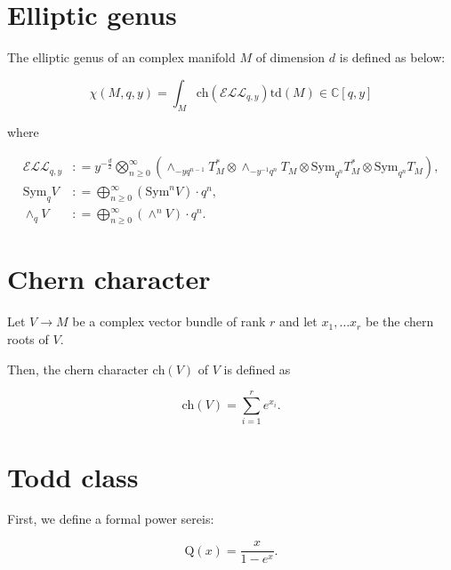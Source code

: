 \documentclass[uplatex,dvipdfmx]{jsarticle}
\newcommand{\defeq}{\mathrel{\mathop:}=}
\newcommand{\Sym}{\mathrm{Sym}}
\newcommand{\ch}[1]{\mathrm{ch}\left( {#1} \right)}
\newcommand{\td}[1]{\mathrm{td}\left( {#1} \right)}
\begin{document}
\section{Elliptic genus}

The elliptic genus of an complex manifold 
$M$
of dimension 
$d$
is defined as below:

\begin{equation}
    \chi(M, q, y)
    =
    \int_M
    \ch{\mathcal{ELL}_{q,y}}
    \td{M}
    \in
    \mathbb{C}[ q, y ]
\end{equation}

where

\begin{align}
    \mathcal{ELL}_{q, y}
    &\defeq
    y^{- \frac{d}{2}}
    \bigotimes_{n \geq 0}^{\infty}
    \left( 
        \wedge_{-yq^{n-1}} T_M^*
        \otimes
        \wedge_{-y^{-1}q^n} T_M
        \otimes
        \Sym_{q^n} T_M^*
        \otimes
        \Sym_{q^n}T_M
    \right), \\
    \Sym_q V
    &\defeq
    \bigoplus_{n \geq 0} ^{\infty}
    \left( 
        \Sym^n V
    \right)
    \cdot
    q^n, \\
    \wedge_q V
    &\defeq
    \bigoplus_{n \geq 0}^{\infty}
    \left( 
        \wedge^n V
    \right)
    \cdot
    q^n.
\end{align}

\section{Chern character}

Let 
$V \to M$ 
be a complex vector bundle of rank 
$r$
and let
$x_1, \ldots x_r$
be the chern roots of
$V$.

Then, the chern character 
$\ch{V}$ 
of 
$V$ 
is defined as

\begin{equation}
    \ch{V} 
    = 
    \sum_{i=1}^{r}
    e^{x_i}.
\end{equation}


\section{Todd class}

First, we define a formal power sereis:

\begin{equation}
    \mathrm{Q}(x)
    =
    \frac{x}{1 - e^x}.
\end{equation}
\end{document}
